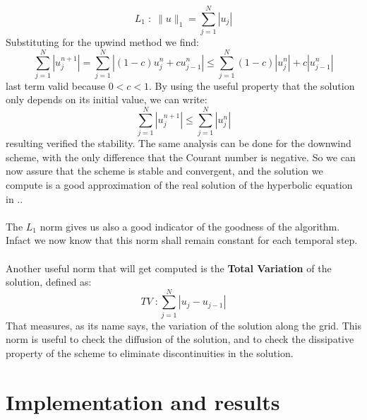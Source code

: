 \documentclass{report}
\begin{document}
\begin{equation*}
    L_1\; : \; \| u \|_1 = \sum_{j=1}^{N} |u_j|
\end{equation*}
Substituting for the upwind method we find:
\begin{equation*}
    \sum_{j=1}^{N} |u^{n+1}_j| = \sum_{j=1}^{N} |(1-c)u^n_j + cu^n_{j-1}| \leq \sum_{j=1}^{N} (1-c)|u^n_j| + c|u^n_{j-1}|
\end{equation*}
last term valid because $ 0 < c < 1$. By using the useful property that the solution only depends on its initial value, we can write:
\begin{equation*}
    \sum_{j=1}^{N} |u^{n+1}_j| \leq \sum_{j=1}^{N} |u^n_j|
\end{equation*}
resulting verified the stability. The same analysis can be done for the downwind scheme, with the only difference that the Courant number is negative.
So we can now assure that the scheme is stable and convergent, and the solution we compute is a good approximation of the real solution of the hyperbolic equation in .. \\\\
The $L_1$ norm gives us also a good indicator of the goodness of the algorithm. Infact we now know that this norm shall remain constant for each temporal step.\\\\
Another useful norm that will get computed is the \textbf{Total Variation} of the solution, defined as:
\begin{equation*}
    TV\; : \sum_{j=1}^{N} |u_j - u_{j-1}|
\end{equation*}
That measures, as its name says, the variation of the solution along the grid. This norm is useful to check the diffusion of the solution, and to check the dissipative property of the scheme to eliminate discontinuities in the solution.

\chapter*{Implementation and results}
\end{document}
